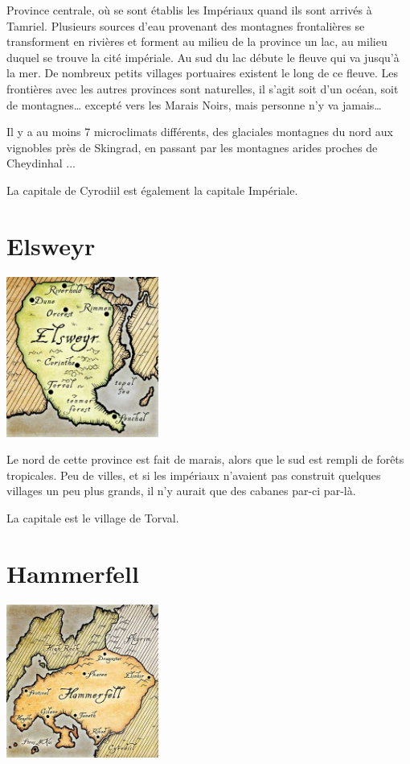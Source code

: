 Province centrale, où se sont établis les Impériaux quand ils sont arrivés à Tamriel. Plusieurs sources d'eau provenant des montagnes frontalières se transforment en rivières et forment au milieu de la province un lac, au milieu duquel se trouve la cité impériale. Au sud du lac débute le fleuve qui va jusqu'à la mer. De nombreux petits villages portuaires existent le long de ce fleuve. Les frontières avec les autres provinces sont naturelles, il s'agit soit d'un océan, soit de montagnes… excepté vers les Marais Noirs, mais personne n'y va jamais…

Il y a au moins 7 microclimats différents, des glaciales montagnes du nord aux vignobles près de Skingrad, en passant par les montagnes arides proches de Cheydinhal ...

La capitale de Cyrodiil est également la capitale Impériale.

\section{Elsweyr}

\begin{center}
\includegraphics[width=5cm]{images/map_elsweyr.jpg}
\end{center}

Le nord de cette province est fait de marais, alors que le sud est rempli de forêts tropicales. Peu de villes, et si les impériaux n'avaient pas construit quelques villages un peu plus grands, il n'y aurait que des cabanes par-ci par-là.

La capitale est le village de Torval.

\section{Hammerfell}

\begin{center}
\includegraphics[width=5cm]{images/map_hammerfell.jpg}
\end{center}

